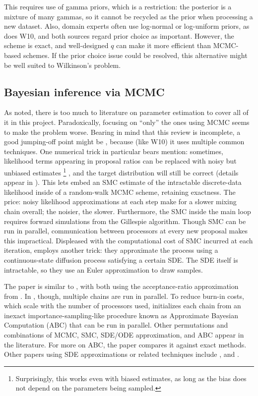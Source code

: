 \documentclass{article}
\begin{document}
This requires use of gamma priors, which is a restriction: the posterior is a mixture of many gammas, so it cannot be recycled as the prior when processing a new dataset. Also, domain experts 
often use log-normal or log-uniform priors, as does W10, and both sources regard prior choice as important. However, the scheme is exact, and well-designed $q$ can make it more efficient than MCMC-based schemes. If the prior choice issue could be resolved, this alternative might be well suited to Wilkinson's problem. 

\subsection{Bayesian inference via MCMC}
As noted, there is too much to literature on parameter estimation to cover all of it in this project. Paradoxically, focusing on ``only'' the ones using MCMC seems to make the problem worse. Bearing in mind that this review is incomplete, a good jumping-off point might be \cite{golightly2011bayesian}, because (like W10) it uses multiple common techniques. One numerical trick in particular bears mention: sometimes, likelihood terms appearing in proposal ratios can be replaced with noisy but unbiased estimates 
%
\footnote{Surprisingly, this works even with biased estimates, as long as the bias does not depend on the parameters being sampled.}
%
, and the target distribution will still be correct (details appear in \cite{andrieu2010particle}). This lets \cite{golightly2011bayesian} embed an SMC estimate of the intractable discrete-data likelihood inside of a random-walk MCMC scheme, retaining exactness. The price: noisy likelihood approximations at each step make for a slower mixing chain overall; the noisier, the slower. Furthermore, the SMC inside the main loop requires forward simulations from the Gillespie algorithm. Though SMC can be run in parallel, communication between processors at every new proposal makes this impractical. Displeased with the computational cost of SMC incurred at each iteration, \cite{golightly2011bayesian} employs another trick: they approximate the process using a continuous-state diffusion process satisfying a certain SDE. The SDE itself is intractable, so they use an Euler approximation to draw samples. 

The paper \cite{owen2014scalable} is similar to \cite{golightly2011bayesian}, with both using the acceptance-ratio approximation from \cite{andrieu2010particle}. In \cite{owen2014scalable}, though, multiple chains are run in parallel. To reduce burn-in costs, which scale with the number of processors used, \cite{owen2014scalable} initializes each chain from an inexact importance-sampling-like procedure known as Approximate Bayesian Computation (ABC) that can be run in parallel. Other permutations and combinations of MCMC, SMC, SDE/ODE approximation, and ABC appear in the literature. For more on ABC, the paper \cite{owen2014ABC_LF-MCMCcomparison} compares it against exact methods. Other papers using SDE approximations or related techniques include \cite{golightly2005bayesian}, \cite{Boys2008} and \cite{fearnhead2014inference}.
\end{document}
